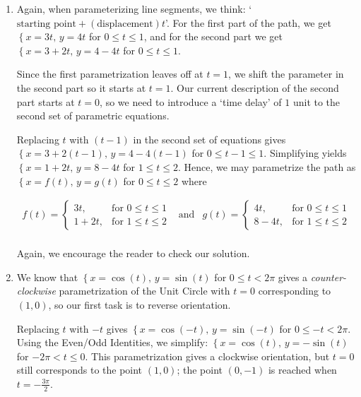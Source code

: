 \documentclass{ximera}
\begin{document}
\begin{ex}
\begin{enumerate}
\item  Again, when parameterizing line segments, we think: `$\text{starting point} + (\text{displacement})t$'.  For the first part of the path, we get $\left\{ x = 3t, \, y = 4t \right.$ for $0 \leq t \leq 1$, and for the second part we get $\left\{ x = 3 + 2t, \, y = 4 - 4t \right.$ for $0 \leq t \leq 1$. 

\smallskip

 Since the first parametrization leaves off at $t=1$, we shift the parameter in the second part so it starts at $t=1$.  Our current description of the second part starts at $t=0$, so we need to introduce a `time delay' of $1$ unit to the second set of parametric equations.  
 
 \smallskip
 
 Replacing $t$ with $(t-1)$ in the second set of  equations gives $\left\{ x = 3 + 2(t-1), \, y = 4 - 4(t-1) \right.$ for $0 \leq t-1 \leq 1$.   Simplifying yields $\left\{ x = 1+2t, \, y = 8  -4t \right.$ for $1 \leq t \leq 2$. Hence, we may parametrize the path as $\left\{ x = f(t), \, y = g(t) \right.$ for $0 \leq t \leq 2$ where

\[ \begin{array}{ccc}

f(t) = \left\{ \begin{array}{rl} 3t, & \text{for $0 \leq t \leq 1$} \\ 1+2t, & \text{for $1 \leq t \leq 2$} \end{array} \right. & \text{and} &  g(t) = \left\{ \begin{array}{rl} 4t, & \text{for $0 \leq t \leq 1$} \\ 8-4t, & \text{for $1 \leq t \leq 2$} \end{array} \right. \\

\end{array}\]

Again, we encourage the reader to check our solution.

\item  We know that $\left\{ x = \cos(t), \, y = \sin(t) \right.$ for $0 \leq t < 2\pi$ gives a \textit{counter-clockwise} parametrization of the Unit Circle with $t = 0$ corresponding to $(1,0)$, so our first task is to reverse  orientation.  

\smallskip

Replacing $t$ with $-t$ gives $\left\{ x = \cos(-t), \, y = \sin(-t) \right.$ for $0 \leq -t < 2\pi$.  Using the Even/Odd Identities, we simplify: $\left\{ x = \cos(t), \, y = -\sin(t) \right.$ for  $-2\pi <  t \leq  0$.  This parametrization gives a clockwise orientation, but $t=0$ still corresponds to the point $(1,0)$; the point $(0, -1)$ is reached when $t = -\frac{3\pi}{2}$.  


\end{enumerate}
\end{ex}
\end{document}
